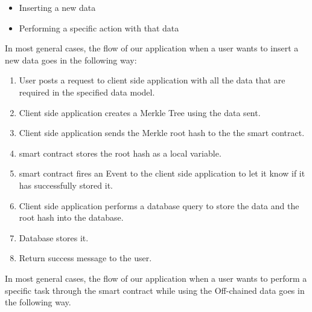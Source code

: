 \begin{itemize}
\item Inserting a new data
\item Performing a specific action with that data
\end{itemize}

In most general cases, the flow of our application when a user wants to insert a new data goes in the following way: 

\begin{enumerate}
\item User posts a request to client side application with all the data that are required in the specified data model. 
\item Client side application creates a Merkle Tree using the data sent.
\item Client side application sends the Merkle root hash to the the smart contract.
\item smart contract stores the root hash as a local variable.
\item smart contract fires an Event to the client side application to let it know if it has successfully stored it. 
\item Client side application performs a database query to store the data and the root hash into the database.
\item Database stores it.
\item Return success message to the user. 
\end{enumerate}

In most general cases, the flow of our application when a user wants to perform a specific task through the smart contract while using the Off-chained data goes in the following way. 


